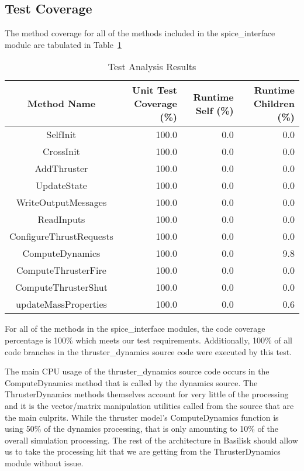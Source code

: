 \subsection{Test Coverage}
The method coverage for all of the methods included in the spice\_interface 
module are tabulated in Table~\ref{tab:cov_met}

\begin{table}[htbp]
	\caption{Test Analysis Results}
	\label{tab:cov_met}
	\centering \fontsize{10}{10}\selectfont
	\begin{tabular}{c | r | r | r} %
		\hline
		Method Name    & Unit Test Coverage (\%) & Runtime Self (\%) & Runtime Children (\%) \\
		\hline
		SelfInit & 100.0 & 0.0 & 0.0 \\
		CrossInit & 100.0 & 0.0 & 0.0 \\
		AddThruster & 100.0 & 0.0 & 0.0 \\
		UpdateState & 100.0 & 0.0 & 0.0 \\
		WriteOutputMessages & 100.0 & 0.0 & 0.0 \\
		ReadInputs & 100.0 & 0.0 & 0.0 \\
		ConfigureThrustRequests & 100.0 & 0.0 & 0.0 \\
		ComputeDynamics & 100.0 & 0.0 & 9.8 \\
		ComputeThrusterFire & 100.0 & 0.0 & 0.0 \\
		ComputeThrusterShut & 100.0 & 0.0 & 0.0 \\
		updateMassProperties & 100.0 & 0.0 & 0.6 \\
		\hline
	\end{tabular}
\end{table}

For all of the methods in the spice\_interface modules, the code coverage 
percentage is 100\% which meets our test requirements.  Additionally, 100\% of 
all code branches in the thruster\_dynamics source code were executed by this 
test.


The main CPU usage of the thruster\_dynamics source code occurs in the 
ComputeDynamics method that is called by the dynamics source.  The 
ThrusterDynamics methods themselves account for very little of the processing 
and it is the vector/matrix manipulation utilities called from the source that 
are the main culprits.  While the thruster model's ComputeDynamics function is 
using 50\% of the dynamics processing, that is only amounting to 10\% of the 
overall simulation processing.  The rest of the architecture in Basilisk should 
allow us to take the processing hit that we are getting from the 
ThrusterDynamics module without issue.

